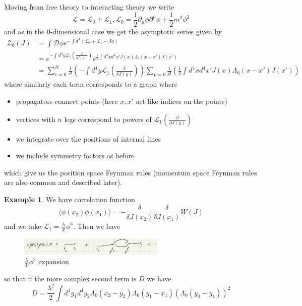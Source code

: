 \documentclass{article}
\theoremstyle{definition}
\newtheorem{example}{Example}
\begin{document}
Moving from free theory to interacting theory we write
\begin{equation}
  \mathcal{L} = \mathcal{L}_0 + \mathcal{L}_1,
  \mathcal{L}_0 = \frac{1}{2} \partial_\mu \phi \partial^\mu \phi
  + \frac{1}{2} m^2 \phi^2
\end{equation}
and as in the 0-dimensional case we get the asymptotic series given by
\begin{align*}
  \mathcal{Z}_0(J)
  &= \int \mathcal{D}\phi e^{-\int d^4 (\mathcal{L}_0 + \mathcal{L}_1 - J\phi)} \\
  &= e^{-\int d^4 y \mathcal{L}_1 \left( \frac{\delta}{\delta J(y)} \right)}
    e^{\frac{1}{2} \int d^4x d^4x' J(x) \Lambda_0 (x - x') J(x')} \\
  &= \sum_{v = 0}^N \frac{1}{v!} \left( - \int d^4 y \mathcal{L}_1 \left(
    \frac{\delta}{\delta J(y)}\right) \right)
    \sum_{p = 0} \frac{1}{p!} \left( \frac{1}{2} \int d^4x d^4x'
    J(x) \Lambda_0(x - x') J(x') \right)
\end{align*}
where similarly each term corresponds to a graph where
\begin{itemize}
\item propagators connect points (here $x, x'$ act like indices on the points)
\item vertices with $n$ legs correspond to powers of $\mathcal{L}_1 \left(
    \frac{\partial}{\partial J(y)} \right)$
\item we integrate over the positions of internal lines
\item we include symmetry factors as before
\end{itemize}
which give us the position space Feynman rules (momentum space Feynman rules are
also common and described later). 

\begin{example}
  We have correlation function
  \begin{equation}
    \langle \phi(x_2) \phi(x_1) \rangle = -\frac{\delta}{\delta J(x_2)}
    \frac{\delta}{\delta J(x_1)} W(J)
  \end{equation}
  and we take $\mathcal{L}_1 = \frac{\lambda}{3!} \phi^3$. Then we have
  \begin{figure}[H]
    \centering
    \includegraphics[width=7cm]{res/AQFT/lec_9_expansion}
    \caption{$\frac{\lambda}{3!} \phi^3$ expansion}
    \label{lec_9_expansion}
  \end{figure}
  so that if the more complex second term is $D$ we have
  \begin{equation}
    D = \frac{\lambda^2}{2} \int d^4y_1 d^4y_2 \Lambda_0(x_2 - y_2)
    \Lambda_0(y_1 - x_1) (\Lambda_0(y_0 - y_1))^2
  \end{equation}
\end{example}
\end{document}
